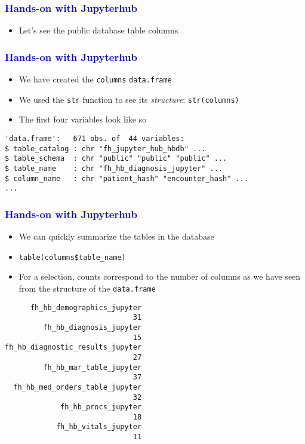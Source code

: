 \documentclass[11pt,pdftex,dvipsnames,usenames]{beamer}
\begin{document}
\begin{frame}[fragile]\frametitle{\bf\textcolor{blue}{Hands-on with Jupyterhub}}
\begin{itemize}
\item Let's see the public database table columns
\end{itemize}

\end{frame}

\begin{frame}[fragile]\frametitle{\bf\textcolor{blue}{Hands-on with Jupyterhub}}
\begin{itemize}
\item We have created the \texttt{columns} \texttt{data.frame}
\item We used the \texttt{str} function to see its {\it structure}: \texttt{str(columns)}
\item The first four variables look like so
\end{itemize}
\begin{verbatim}
'data.frame':	671 obs. of  44 variables:
$ table_catalog : chr "fh_jupyter_hub_hbdb" ...
$ table_schema  : chr "public" "public" "public" ...
$ table_name    : chr "fh_hb_diagnosis_jupyter" ...
$ column_name   : chr "patient_hash" "encounter_hash" ...
...
\end{verbatim}
\end{frame}


\begin{frame}[fragile]\frametitle{\bf\textcolor{blue}{Hands-on with Jupyterhub}}
\begin{itemize}
\item We can quickly summarize the tables in the database
\item \texttt{table(columns\$table\_name)}
\item For a selection, counts correspond to the number of columns as we have seen from the structure of the \texttt{data.frame}
\end{itemize}
\begin{verbatim}
      fh_hb_demographics_jupyter          
                              31
         fh_hb_diagnosis_jupyter 
                              15 
fh_hb_diagnostic_results_jupyter
                              27
         fh_hb_mar_table_jupyter
                              37
  fh_hb_med_orders_table_jupyter 
                              32 
             fh_hb_procs_jupyter
                              18 
            fh_hb_vitals_jupyter 
                              11 
\end{verbatim}
\end{frame}
\end{document}
